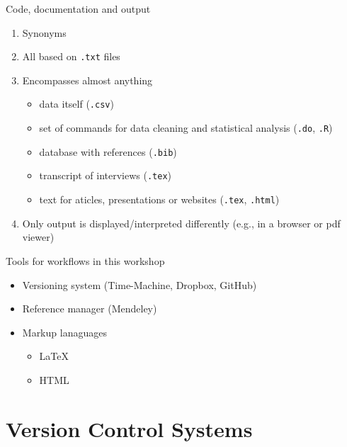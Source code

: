 \documentclass[ignorenonframetext,]{beamer}
\begin{document}
\begin{frame}{Code, documentation and output}

\begin{enumerate}
\def\labelenumi{\arabic{enumi}.}
\item
  Synonyms
\item
  All based on \texttt{.txt} files
\item
  Encompasses almost anything

  \begin{itemize}
  \itemsep1pt\parskip0pt
  \item
    data itself (\texttt{.csv})
  \item
    set of commands for data cleaning and statistical analysis
    (\texttt{.do}, \texttt{.R})
  \item
    database with references (\texttt{.bib})
  \item
    transcript of interviews (\texttt{.tex})
  \item
    text for aticles, presentations or websites (\texttt{.tex},
    \texttt{.html})
  \end{itemize}
\item
  Only output is displayed/interpreted differently (e.g., in a browser
  or pdf viewer)
\end{enumerate}

\end{frame}

\begin{frame}{Tools for workflows in this workshop}

\begin{itemize}
\item
  Versioning system (Time-Machine, Dropbox, GitHub)
\item
  Reference manager (Mendeley)
\item
  Markup lanaguages

  \begin{itemize}
  \itemsep1pt\parskip0pt
  \item
    \LaTeX 
  \item
    HTML
  \end{itemize}
\end{itemize}

\end{frame}

\section{Version Control Systems}\label{version-control-systems}
\end{document}
